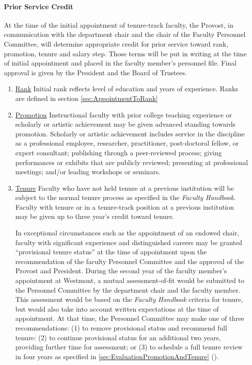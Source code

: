 			\paragraph{Prior Service Credit}
				\label{sec:PriorServiceCredit}
				At the time of the initial appointment of tenure-track faculty, the Provost, in communication with the department chair and the chair of the Faculty Personnel Committee, will determine appropriate credit for prior service toward rank, promotion, tenure and salary step.  Those terms will be put in writing at the time of initial appointment and placed in the faculty member's personnel file.  Final approval is given by the President and the Board of Trustees.
				\begin{enumerate}[label=\alph*)]

					\item{\underline{Rank} Initial rank reflects level of education and
						years of experience.  Ranks are defined in
						section
						\ref{sec:AppointmentToRank}
					}

					\item{\underline{Promotion} Instructional faculty with prior
						college teaching experience or scholarly or artistic
						achievement may be given advanced standing towards
						promotion.  Scholarly or artistic achievement includes
						service in the discipline as a professional employee,
						researcher, practitioner, post-doctoral fellow, or expert
						consultant; publishing through a peer-reviewed process;
						giving performances or exhibits that are publicly reviewed;
						presenting at professional meetings; and/or leading
						workshops or seminars.}

					\item{\underline{Tenure} Faculty who have not held tenure at
						a previous institution will be subject to the normal tenure
						process as specified in the \emph{Faculty Handbook}.
						Faculty with tenure or in a tenure-track position at a
						previous institution may be given up to three year's credit
						toward tenure.

						In exceptional circumstances such as the appointment of an
						endowed chair, faculty with significant experience and
						distinguished careers may be granted ``provisional tenure
						status'' at the time of appointment upon the recommendation of
						the faculty Personnel Committee and the approval of the Provost
						and President.  During the second year of the faculty member's
						appointment at Westmont, a mutual assessment-of-fit would be
						submitted to the Personnel Committee by the department chair and
						the faculty member.  This assessment would be based on the
						\emph{Faculty Handbook} criteria for tenure, but would also take
						into account written expectations at the time of appointment.
						At that time, the Personnel Committee may make one of three
						recommendations: (1) to remove provisional status and recommend
						full tenure: (2) to continue provisional status for an
						additional two years, providing further time for assessment; or
						(3) to schedule a full tenure review in four years as specified
						in
						\ref{sec:EvaluationPromotionAndTenure}
						().}


\end{enumerate}

